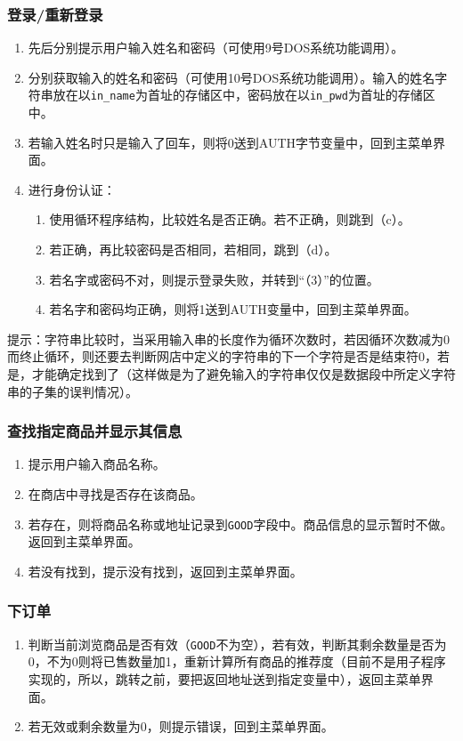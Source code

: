 \documentclass{ctexrep}
\begin{document}
\subsubsection{登录/重新登录}
\begin{enumerate}
    \item 先后分别提示用户输入姓名和密码（可使用9号DOS系统功能调用）。
    \item 分别获取输入的姓名和密码（可使用10号DOS系统功能调用）。输入的姓名字符串放在以\texttt{in\_name}为首址的存储区中，密码放在以\texttt{in\_pwd}为首址的存储区中。
    \item 若输入姓名时只是输入了回车，则将0送到AUTH字节变量中，回到主菜单界面。
    \item 进行身份认证：\begin{enumerate}
        \item 使用循环程序结构，比较姓名是否正确。若不正确，则跳到（c）。
        \item 若正确，再比较密码是否相同，若相同，跳到（d）。
        \item 若名字或密码不对，则提示登录失败，并转到“（3）”的位置。
        \item 若名字和密码均正确，则将1送到AUTH变量中，回到主菜单界面。
    \end{enumerate}
\end{enumerate}
提示：字符串比较时，当采用输入串的长度作为循环次数时，若因循环次数减为0而终止循环，则还要去判断网店中定义的字符串的下一个字符是否是结束符0，若是，才能确定找到了（这样做是为了避免输入的字符串仅仅是数据段中所定义字符串的子集的误判情况）。
\subsubsection{查找指定商品并显示其信息}
\begin{enumerate}
    \item 提示用户输入商品名称。
    \item 在商店中寻找是否存在该商品。
    \item 若存在，则将商品名称或地址记录到\texttt{GOOD}字段中。商品信息的显示暂时不做。返回到主菜单界面。
    \item 若没有找到，提示没有找到，返回到主菜单界面。
\end{enumerate}
\subsubsection{下订单}
\begin{enumerate}
    \item 判断当前浏览商品是否有效（\texttt{GOOD}不为空），若有效，判断其剩余数量是否为0，不为0则将已售数量加1，重新计算所有商品的推荐度（目前不是用子程序实现的，所以，跳转之前，要把返回地址送到指定变量中），返回主菜单界面。
    \item 若无效或剩余数量为0，则提示错误，回到主菜单界面。
\end{enumerate}
\end{document}
